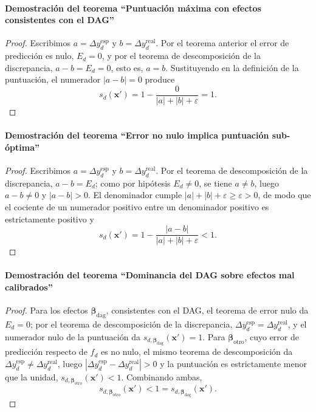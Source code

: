 \documentclass[12pt]{report} %
\begin{document}
\paragraph*{Demostración del teorema ``Puntuación máxima con efectos consistentes con el DAG''}
\begin{proof}
    Escribimos $a = \Delta y_d^{\text{esp}}$ y $b = \Delta y_d^{\text{real}}$. Por el teorema anterior el error de predicción es nulo, $E_d = 0$, y por el teorema de descomposición de la discrepancia, $a - b = E_d = 0$, esto es, $a = b$. Sustituyendo en la definición de la puntuación, el numerador $|a - b| = 0$ produce
    $$s_d(\mathbf{x}') = 1 - \frac{0}{|a| + |b| + \varepsilon} = 1.$$
\end{proof}

\paragraph*{Demostración del teorema ``Error no nulo implica puntuación sub-óptima''}
\begin{proof}
    Escribimos $a = \Delta y_d^{\text{esp}}$ y $b = \Delta y_d^{\text{real}}$. Por el teorema de descomposición de la discrepancia, $a - b = E_d$; como por hipótesis $E_d \neq 0$, se tiene $a \neq b$, luego $a - b \neq 0$ y $|a - b| > 0$. El denominador cumple $|a| + |b| + \varepsilon \geq \varepsilon > 0$, de modo que el cociente de un numerador positivo entre un denominador positivo es estrictamente positivo y
    $$s_d(\mathbf{x}') = 1 - \frac{|a - b|}{|a| + |b| + \varepsilon} < 1.$$
\end{proof}

\paragraph*{Demostración del teorema ``Dominancia del DAG sobre efectos mal calibrados''}
\begin{proof}
    Para los efectos $\boldsymbol{\beta}_{\text{dag}}$, consistentes con el DAG, el teorema de error nulo da $E_d = 0$; por el teorema de descomposición de la discrepancia, $\Delta y_d^{\text{esp}} = \Delta y_d^{\text{real}}$, y el numerador nulo de la puntuación da $s_{d, \boldsymbol{\beta}_{\text{dag}}}(\mathbf{x}') = 1$. Para $\boldsymbol{\beta}_{\text{otro}}$, cuyo error de predicción respecto de $f_d$ es no nulo, el mismo teorema de descomposición da $\Delta y_d^{\text{esp}} \neq \Delta y_d^{\text{real}}$, luego $|\Delta y_d^{\text{esp}} - \Delta y_d^{\text{real}}| > 0$ y la puntuación es estrictamente menor que la unidad, $s_{d, \boldsymbol{\beta}_{\text{otro}}}(\mathbf{x}') < 1$. Combinando ambas,
    $$s_{d, \boldsymbol{\beta}_{\text{otro}}}(\mathbf{x}') < 1 = s_{d, \boldsymbol{\beta}_{\text{dag}}}(\mathbf{x}').$$
\end{proof}
\end{document}
